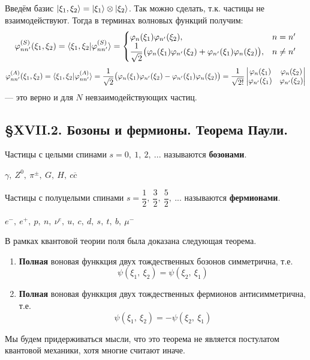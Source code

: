 \begin{example}
	Введём базис $| \xi_1, \xi_2 \rangle = | \xi_1 \rangle \otimes | \xi_2 \rangle$. Так можно сделать, т.к. частицы не взаимодействуют. Тогда в терминах волновых функций получим:
	\[
	\varphi_{nn'}^{(S)}(\xi_1, \xi_2) = \langle \xi_1, \xi_2 | \varphi_{nn'}^{(S)} \rangle = 
	\begin{cases} 
		\varphi_n(\xi_1)\varphi_{n'}(\xi_2), & n = n' \\
		\dfrac{1}{\sqrt{2}} \big( \varphi_n(\xi_1)\varphi_{n'}(\xi_2) + \varphi_{n'}(\xi_1)\varphi_n(\xi_2) \big), & n \neq n' 
	\end{cases}
	\]
	\[
	\varphi_{nn'}^{(A)}(\xi_1, \xi_2) = \langle \xi_1, \xi_2 | \varphi_{nn'}^{(A)} \rangle = \dfrac{1}{\sqrt{2}} \big( \varphi_n(\xi_1)\varphi_{n'}(\xi_2) - \varphi_{n'}(\xi_1)\varphi_n(\xi_2) \big) = \dfrac{1}{\sqrt{2!}} 
	\begin{vmatrix} 
		\varphi_n(\xi_1) & \varphi_n(\xi_2) \\
		\varphi_{n'}(\xi_1) & \varphi_{n'}(\xi_2)
	\end{vmatrix}
	\]
	--- это верно и для $N$ невзаимодействующих частиц.
\end{example}







\subsection{\S XVII.2. Бозоны и фермионы. Теорема Паули.}
\begin{definition}
	Частицы с целыми спинами $s = 0,~1,~2,~...$ называются \textbf{бозонами}.
\end{definition}
\begin{example}
	$\gamma,~Z^0,~ \pi^\pm,~ G,~ H,~ c\overline{c}$
\end{example}

\begin{definition}
	Частицы с полуцелыми спинами $s = \dfrac{1}{2},~ \dfrac{3}{2},~ \dfrac{5}{2},~ ...$ называются \textbf{фермионами}.
\end{definition}
\begin{example}
	$e^-,~ e^+,~ p,~ n,~ \nu^e,~ u,~ c,~ d,~ s,~ t,~b,~\mu^-$
\end{example}

В рамках квантовой теории поля была доказана следующая теорема.

\begin{theorem}[Паули]
	\tab
	\begin{enumerate}
		\item \textbf{Полная} воновая функкция двух тождественных бозонов симметрична, т.е.
		\[
		\psi(\xi_1,~\xi_2) = \psi(\xi_2,~\xi_1)
		\]
		\item \textbf{Полная} воновая функкция двух тождественных фермионов антисимметрична, т.е.
		\[
		\psi(\xi_1,~\xi_2) = -\psi(\xi_2,~\xi_1)
		\]
	\end{enumerate}
\end{theorem}
Мы будем придерживаться мысли, что это теорема не является постулатом квантовой механики, хотя многие считают иначе.\\






